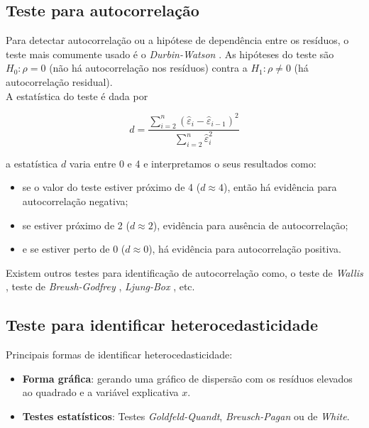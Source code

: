 \subsection{Teste para autocorrelação}
\label{ch:testedw}
\noindent Para detectar autocorrelação ou a hipótese de dependência entre os resíduos, o teste mais comumente usado é o \textit{Durbin-Watson} \cite{durbin1992testing}. As hipóteses do teste são $H_0: \rho = 0$ (não há autocorrelação nos resíduos) contra a $H_1: \rho \neq 0$ (há autocorrelação residual).\\

\noindent A estatística do teste é dada por

\begin{equation}
    \label{eq:eq69}
    d = \dfrac{\sum_{i=2}^n (\hat{\varepsilon}_i - \hat{\varepsilon}_{i-1})^2}{\sum_{i=2}^n \hat{\varepsilon}_i^2}
\end{equation}

\noindent a estatística $d$ varia entre 0 e 4 e interpretamos o seus resultados como:

\begin{itemize}
    \item se o valor do teste estiver próximo de 4 ($d \approx 4$), então há evidência para autocorrelação negativa;
    
    \item se estiver próximo de 2 ($d \approx 2$), evidência para ausência de autocorrelação;
    
    \item e se estiver perto de 0 ($d \approx 0$), há evidência para autocorrelação positiva.
\end{itemize}

\noindent Existem outros testes para identificação de autocorrelação como, o teste de \textit{Wallis} \cite{wallis1972testing}, teste de \textit{Breush-Godfrey} \cite{godfrey1978testing}, \textit{Ljung-Box} \cite{ljung1978measure}, etc.


\subsection{Teste para identificar heterocedasticidade}

\noindent Principais formas de identificar heterocedasticidade:

\begin{itemize}
    \item \textbf{Forma gráfica}: gerando uma gráfico de dispersão com os resíduos elevados ao quadrado e a variável explicativa $x$.
    
    \item \textbf{Testes estatísticos}: Testes \textit{Goldfeld-Quandt}, \textit{Breusch-Pagan} ou de \textit{White}.
\end{itemize}

